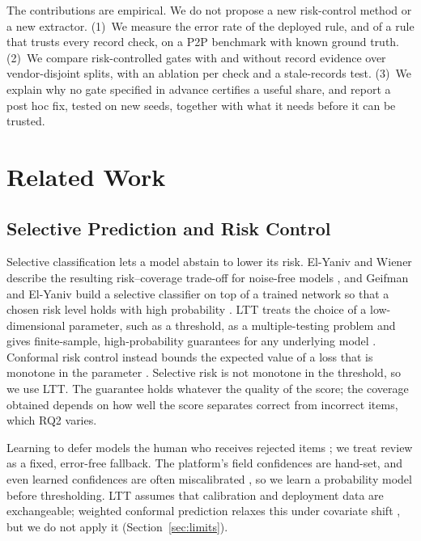 \documentclass[conference]{IEEEtran}
\begin{document}
The contributions are empirical. We do not propose a new risk-control method or
a new extractor. (1)~We measure the error rate of the deployed rule, and of a
rule that trusts every record check, on a P2P benchmark with known ground truth.
(2)~We compare risk-controlled gates with and without record evidence over
vendor-disjoint splits, with an ablation per check and a stale-records test.
(3)~We explain why no gate specified in advance certifies a useful share, and
report a post hoc fix, tested on new seeds, together with what it needs before it can be trusted.



\section{Related Work}\label{sec:related}
\subsection{Selective Prediction and Risk Control}
Selective classification lets a model abstain to lower its risk. El-Yaniv and
Wiener describe the resulting risk--coverage trade-off for noise-free
models \cite{elyaniv2010}, and Geifman and El-Yaniv build a selective classifier
on top of a trained network so that a chosen risk level holds with high
probability \cite{geifman2017}. LTT treats the choice of a low-dimensional
parameter, such as a threshold, as a multiple-testing problem and gives
finite-sample, high-probability guarantees for any underlying
model \cite{angelopoulos2025ltt}. Conformal risk control instead bounds the
expected value of a loss that is monotone in the
parameter \cite{angelopoulos2024crc}. Selective risk is not monotone in the
threshold, so we use LTT. The guarantee holds whatever the quality of
the score; the coverage obtained depends on how well the score
separates correct from incorrect items, which RQ2 varies.

Learning to defer models the human who receives rejected
items \cite{madras2018,mozannar2020}; we treat review as a fixed, error-free
fallback. The platform's field confidences are hand-set,
and even learned confidences are often miscalibrated \cite{guo2017},
so we learn a probability model before thresholding. LTT assumes that calibration and deployment
data are exchangeable; weighted conformal prediction relaxes this under
covariate shift \cite{tibshirani2019}, but we do not apply it (Section~\ref{sec:limits}).
\end{document}
